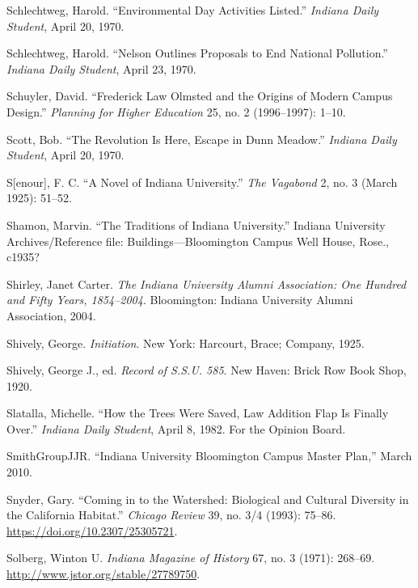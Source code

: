 \documentclass[
  american,
  letterpaper,
]{scrreprt}
\newlength{\cslhangindent}
\newenvironment{CSLReferences}[2] %
 {\begin{list}{}{%
  \setlength{\itemindent}{0pt}
  \setlength{\leftmargin}{0pt}
  \setlength{\parsep}{0pt}
  \ifodd #1
   \setlength{\leftmargin}{\cslhangindent}
   \setlength{\itemindent}{-1\cslhangindent}
  \fi
  \setlength{\itemsep}{#2\baselineskip}}}
 {\end{list}}
\begin{document}
\begin{CSLReferences}{1}{0}
Schlechtweg, Harold. {``Environmental Day Activities Listed.''}
\emph{Indiana Daily Student}, April 20, 1970.

Schlechtweg, Harold. {``Nelson Outlines Proposals to End National
Pollution.''} \emph{Indiana Daily Student}, April 23, 1970.

Schuyler, David. {``Frederick Law Olmsted and the Origins of Modern
Campus Design.''} \emph{Planning for Higher Education} 25, no. 2
(1996--1997): 1--10.

Scott, Bob. {``The Revolution Is Here, Escape in Dunn Meadow.''}
\emph{Indiana Daily Student}, April 20, 1970.

S{[}enour{]}, F. C. {``A Novel of Indiana University.''} \emph{The
Vagabond} 2, no. 3 (March 1925): 51--52.

Shamon, Marvin. {``The Traditions of Indiana University.''} Indiana
University Archives/Reference file: Buildings---Bloomington Campus Well
House, Rose., c1935?

Shirley, Janet Carter. \emph{The Indiana University Alumni Association:
One Hundred and Fifty Years, 1854--2004}. Bloomington: Indiana
University Alumni Association, 2004.

Shively, George. \emph{Initiation}. New York: Harcourt, Brace; Company,
1925.

Shively, George J., ed. \emph{Record of {S.S.U.} 585}. New Haven: Brick
Row Book Shop, 1920.

Slatalla, Michelle. {``How the Trees Were Saved, Law Addition Flap Is
Finally Over.''} \emph{Indiana Daily Student}, April 8, 1982. For the
Opinion Board.

SmithGroupJJR. {``Indiana University Bloomington Campus Master Plan,''}
March 2010.

Snyder, Gary. {``Coming in to the Watershed: Biological and Cultural
Diversity in the California Habitat.''} \emph{Chicago Review} 39, no.
3/4 (1993): 75--86. \url{https://doi.org/10.2307/25305721}.

Solberg, Winton U. \emph{Indiana Magazine of History} 67, no. 3 (1971):
268--69. \url{http://www.jstor.org/stable/27789750}.


\end{CSLReferences}
\end{document}
